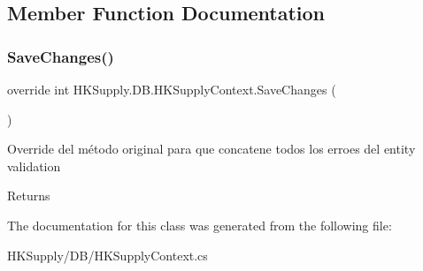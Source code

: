 \subsection{Member Function Documentation}
\mbox{\label{class_h_k_supply_1_1_d_b_1_1_h_k_supply_context_a2a1188ce8fd98551e036cb87ae342132}} 
\subsubsection{\texorpdfstring{Save\+Changes()}{SaveChanges()}}
{\footnotesize\ttfamily override int H\+K\+Supply.\+D\+B.\+H\+K\+Supply\+Context.\+Save\+Changes (\begin{DoxyParamCaption}{ }\end{DoxyParamCaption})}



Override del método original para que concatene todos los erroes del entity validation 

\begin{DoxyReturn}{Returns}

\end{DoxyReturn}


The documentation for this class was generated from the following file\+:\begin{DoxyCompactItemize}
\item 
H\+K\+Supply/\+D\+B/H\+K\+Supply\+Context.\+cs\end{DoxyCompactItemize}
